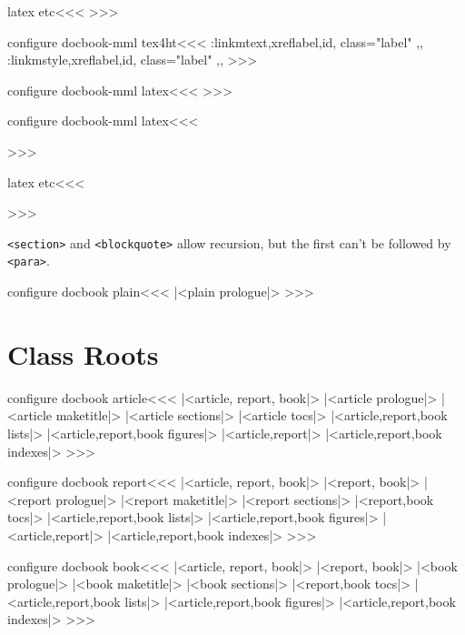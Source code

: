 \<latex etc\><<<
>>>

\<configure docbook-mml tex4ht\><<< 
\LinkCommand\mtxt:link{mtext,xreflabel,id, class="label" ,,\empty}
\LinkCommand\msp:link{mstyle,xreflabel,id, class="label" ,,\empty}
>>>



\<configure docbook-mml latex\><<< 
  {\ifmtext {}%
   \else {}\fi}
>>>

\<configure docbook-mml latex\><<<
   {\IgnorePar\EndP{}}
   {}
   {\IgnorePar{}\ShowPar\par}
>>>







\<latex etc\><<<
   {\IgnorePar\EndP{}}
   {\ShowPar\par}
   {\IgnorePar\EndP{}\ShowPar\par}
>>>

\verb+<section>+ and \verb+<blockquote>+ allow recursion,
but the first can't be followed by \verb+<para>+.


\<configure docbook plain\><<< 
|<plain prologue|>
>>>

\section{Class Roots}

\<configure docbook article\><<< 
|<article, report, book|>
|<article prologue|>
|<article maketitle|>
|<article sections|>
|<article tocs|>
|<article,report,book lists|>
|<article,report,book figures|>
|<article,report|>
|<article,report,book indexes|>
>>>



\<configure docbook report\><<< 
|<article, report, book|>
|<report, book|>
|<report prologue|>
|<report maketitle|>
|<report sections|>
|<report,book tocs|>
|<article,report,book lists|>
|<article,report,book figures|>
|<article,report|>
|<article,report,book indexes|>
>>>



\<configure docbook book\><<< 
|<article, report, book|>
|<report, book|>
|<book prologue|>
|<book maketitle|>
|<book sections|>
|<report,book tocs|>
|<article,report,book lists|>
|<article,report,book figures|>
|<article,report,book indexes|>
>>>



